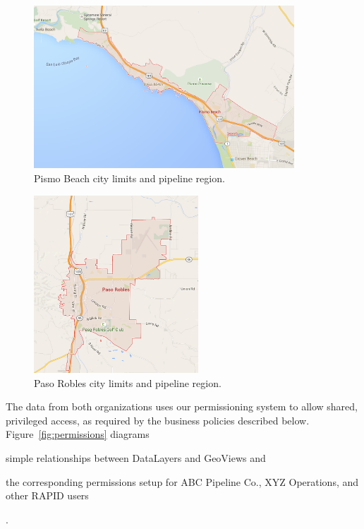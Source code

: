 \begin{figure}[ht]
    \centering
    \includegraphics[width=0.87\textwidth]{figures/pismo.png}
    \caption{Pismo Beach city limits and pipeline region.}
    \label{fig:pismo}
\end{figure}

\begin{figure}[ht]
    \centering
    \includegraphics[width=0.55\textwidth]{figures/paso.png}
    \caption{Paso Robles city limits and pipeline region.}
    \label{fig:paso}
\end{figure}

The data from both organizations uses our permissioning system to allow shared, privileged access, as required by the business policies described below. Figure~\ref{fig:permissions} diagrams  
\begin{enumerate*}[label=\itshape\alph*\upshape)]
\item simple relationships between DataLayers and GeoViews and
\item the corresponding permissions setup for ABC Pipeline Co., XYZ Operations, and other RAPID users
\end{enumerate*}.

